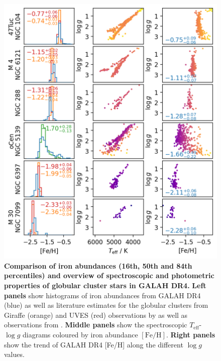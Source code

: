 \documentclass[
  journal=pasa,
  manuscript=research-paper, %
  year=2024,
  volume=37
]{cup-journal}
\newcommand{\Teff}{$T_\mathrm{eff}$\xspace}
\newcommand{\logg}{$\log g$\xspace}
\newcommand{\feh}{$\mathrm{[Fe/H]}$\xspace}
\begin{document}
\begin{figure}[ht]
 \centering
 \includegraphics[width=\columnwidth]{figures/galah_dr4_allstar_globular_cluster_feh_comparison.png}
 \caption{\textbf{Comparison of iron abundances (16th, 50th and 84th percentiles) and overview of spectroscopic and photometric properties of globular cluster stars in GALAH DR4.}
 \textbf{Left panels} show histograms of iron abundances from GALAH DR4 (blue) as well as literature estimates for the globular clusters from Giraffe (orange) and UVES (red) observations by \citep{Carretta2009c, Carretta2009} as well as observations from \cite{Johnson2010}.
 \textbf{Middle panels} show the spectroscopic \Teff-\logg diagrams coloured by iron abundance \feh.
 \textbf{Right panels} show the trend of GALAH DR4 [Fe/H] along the different \logg values.
}
 \label{fig:galah_dr4_allstar_globular_cluster_feh_comparison}
\end{figure}
\end{document}
